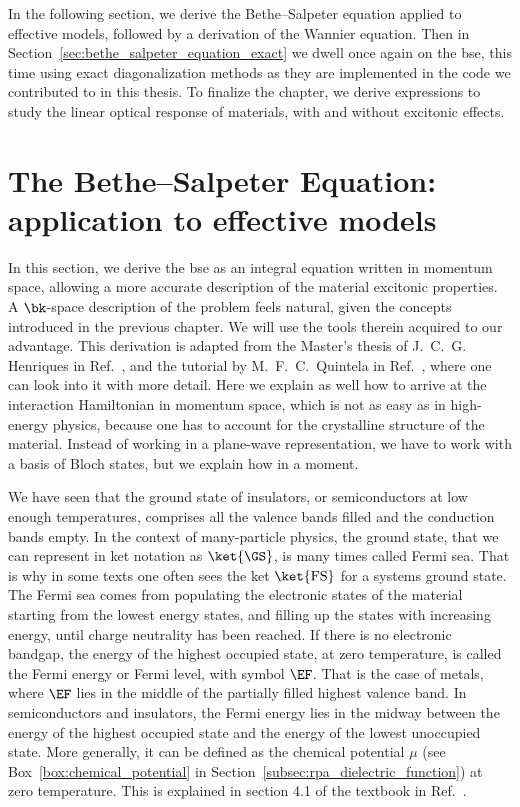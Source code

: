 In the following section, we derive the Bethe--Salpeter equation applied to effective models, followed by a derivation of the Wannier equation.
Then in Section~\ref{sec:bethe_salpeter_equation_exact} we dwell once again on the \gls{bse}, this time using exact diagonalization methods as they are implemented in the code we contributed to in this thesis.
To finalize the chapter, we derive expressions to study the linear optical response of materials, with and without excitonic effects.


\section{The Bethe--Salpeter Equation: application to effective models}
\label{sec:bethe_salpeter_equation_effective_models}

In this section, we derive the \gls{bse} as an integral equation written in momentum space, allowing a more accurate description of the material excitonic properties.
A $\bk$-space description of the problem feels natural, given the concepts introduced in the previous chapter.
We will use the tools therein acquired to our advantage.
This derivation is adapted from the Master's thesis of J.~C.~G. Henriques in Ref.~\cite{Henriques_thesis}, and the tutorial by M.~F.~C.~Quintela in Ref.~\cite{Mauricio_2022}, where one can look into it with more detail.
Here we explain as well how to arrive at the interaction Hamiltonian in momentum space, which is not as easy as in high-energy physics, because one has to account for the crystalline structure of the material.
Instead of working in a plane-wave representation, we have to work with a basis of Bloch states, but we explain how in a moment.

We have seen that the ground state of insulators, or semiconductors at low enough temperatures, comprises all the valence bands filled and the conduction bands empty.
In the context of many-particle physics, the ground state, that we can represent in ket notation as $\ket{\GS}$, is many times called Fermi sea.
That is why in some texts one often sees the ket $\ket{\mathrm{FS}}$ for a systems ground state.
The Fermi sea comes from populating the electronic states of the material starting from the lowest energy states, and filling up the states with increasing energy, until charge neutrality has been reached.
If there is no electronic bandgap, the energy of the highest occupied state, at zero temperature, is called the Fermi energy or Fermi level, with symbol $\EF$.
That is the case of metals, where $\EF$ lies in the middle of the partially filled highest valence band.
In semiconductors and insulators, the Fermi energy lies in the midway between the energy of the highest occupied state and the energy of the lowest unoccupied state.
More generally, it can be defined as the chemical potential $\mu$ (see Box~\ref{box:chemical_potential} in Section~\ref{subsec:rpa_dielectric_function}) at zero temperature.
This is explained in section 4.1 of the textbook in Ref.~\cite{Simon_Oxford_2013}.

